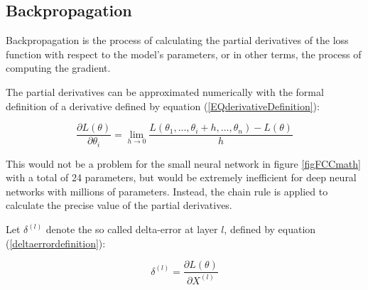 \documentclass[a4paper, twoside]{article}
\newcommand*{\pd}[2]{\ensuremath{\dfrac{\partial #1}{\partial #2}}}
\newcommand*{\inpd}[2]{\ensuremath{\frac{\partial #1}{\partial #2}}}
\begin{document}
\subsection{Backpropagation}
Backpropagation is the process of calculating the partial derivatives of the loss function with respect to the model's parameters, or in other terms, the process of computing the gradient. \cite{wikiStanford} \cite{gradient}

The partial derivatives can be approximated numerically with the formal definition of a derivative defined by equation (\ref{EQderivativeDefinition}): \cite{wikiStanford} \cite{gradient}

\begin{equation}\label{EQderivativeDefinition}
\pd{L(\theta)}{\theta_{i}} = \lim_{h \to 0} \frac{L(\theta_{1},...,\theta_{i} + h, ..., \theta_{n})-L(\theta)}{h}
\end{equation}

This would not be a problem for the small neural network in figure \ref{figFCCmath} with a total of 24 parameters, but would be extremely inefficient for deep neural networks with millions of parameters. Instead, the chain rule is applied to calculate the precise value of the partial derivatives. \cite{cs231n}

Let $\delta^{(l)}$ denote the so called delta-error at layer $l$, defined by equation (\ref{deltaerrordefinition}):

\begin{equation}\label{deltaerrordefinition}
\delta^{(l)} = \inpd{L(\theta)}{X^{(l)}}
\end{equation}
\end{document}
